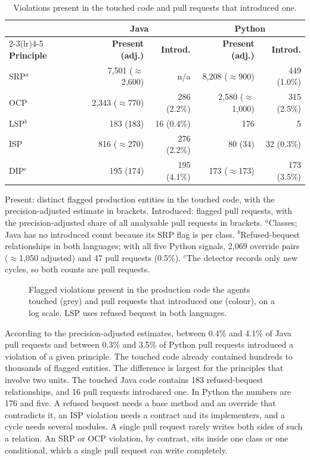 \documentclass[sigconf]{acmart}
\begin{document}
\begin{table}[t]
\caption{Violations present in the touched code and pull requests that introduced one.}
\label{tab:present}
\footnotesize
\setlength{\tabcolsep}{2.4pt}
\begin{tabular}{@{}lrrrr@{}}
\toprule
 & \multicolumn{2}{c}{\textbf{Java}} & \multicolumn{2}{c}{\textbf{Python}} \\
\cmidrule(lr){2-3}\cmidrule(lr){4-5}
\textbf{Principle} & \textbf{Present (adj.)} & \textbf{Introd.} & \textbf{Present (adj.)} & \textbf{Introd.} \\
\midrule
SRP$^a$ & 7,501 ($\approx$2,600) & n/a & 8,208 ($\approx$900) & 449 (1.0\%) \\
OCP & 2,343 ($\approx$770) & 286 (2.2\%) & 2,580 ($\approx$1,000) & 315 (2.5\%) \\
LSP$^b$ & 183 (183) & 16 (0.4\%) & 176 & 5 \\
ISP & 816 ($\approx$270) & 276 (2.2\%) & 80 (34) & 32 (0.3\%) \\
DIP$^c$ & 195 (174) & 195 (4.1\%) & 173 ($\approx$173) & 173 (3.5\%) \\
\bottomrule
\end{tabular}

\vspace{3pt}
\raggedright\scriptsize Present: distinct flagged production entities in the touched code, with the
precision-adjusted estimate in brackets. Introduced: flagged pull requests, with the
precision-adjusted share of all analysable pull requests in brackets. $^a$Classes; Java has no
introduced count because its SRP flag is per class. $^b$Refused-bequest relationships in both
languages; with all five Python signals, 2,069 override pairs ($\approx$1,050 adjusted) and 47 pull
requests (0.5\%).
$^c$The detector records only new cycles, so both counts are pull requests.
\end{table}

\begin{figure}[t]
\centering

\caption{Flagged violations present in the production code the agents touched (grey) and pull
requests that introduced one (colour), on a log scale. LSP uses refused bequest in both languages.}
\label{fig:present}
\end{figure}

According to the precision-adjusted estimates, between 0.4\% and 4.1\% of Java pull requests and
between 0.3\% and 3.5\% of Python pull requests introduced a violation of a given principle. The touched code already
contained hundreds to thousands of flagged entities. The difference is largest for the principles
that involve two units. The touched Java code contains 183 refused-bequest relationships, and 16 pull
requests introduced one. In Python the numbers are 176 and five. A refused bequest needs a base
method and an override that contradicts it, an ISP violation needs a contract and its implementers,
and a cycle needs several modules. A single pull request rarely writes both sides of such a relation.
An SRP or OCP violation, by contrast, sits inside one class or one conditional, which a single pull
request can write completely.
\end{document}
